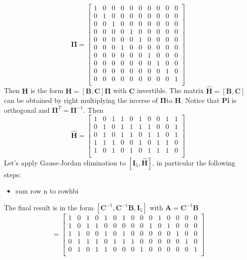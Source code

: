 \documentclass[10pt]{article}
\begin{document}
\begin{equation}
	\mathbf{\Pi} = 
	\begin{bmatrix}
		1&0&0&0&0&0&0&0&0&0\\
		0&1&0&0&0&0&0&0&0&0\\
		0&0&1&0&0&0&0&0&0&0\\
		0&0&0&0&1&0&0&0&0&0\\
		0&0&0&0&0&1&0&0&0&0\\
		0&0&0&1&0&0&0&0&0&0\\
		0&0&0&0&0&0&1&0&0&0\\
		0&0&0&0&0&0&0&1&0&0\\
		0&0&0&0&0&0&0&0&1&0\\
		0&0&0&0&0&0&0&0&0&1\\
	\end{bmatrix}
\end{equation}
Then $\mathbf{H}$ is the form $\mathbf{H} = [\mathbf{B}, \mathbf{C}]\mathbf{\Pi}$ with $\mathbf{C}$ invertible. The matrix $\mathbf{\hat{H}} = [\mathbf{B}, \mathbf{C}]$ can be obtained by right multiplying the inverse of $\mathbf{\Pi}$to $\mathbf{H}$. Notice that $\mathbf{Pi}$ is orthogonal and $\mathbf{\Pi}^T = \mathbf{\Pi}^{-1}$. Then 
\begin{equation}
\mathbf{\hat{H}} =
	\begin{bmatrix}
		1&0&1&1&0&1&0&0&1&1\\
		0&1&0&1&1&1&1&0&0&1\\
		0&1&0&1&1&0&1&1&0&1\\
		1&1&1&0&0&1&0&1&1&0\\
		1&0&1&0&1&0&1&1&1&0\\
	\end{bmatrix}
\end{equation}
Let's apply Gauss-Jordan elimination to $[\mathbf{I}_5, \mathbf{\hat{H}}]$, in particular the following steps:
\begin{itemize}
 \item sum row n to rowhbi
\end{itemize}
The final result is in the form $[\mathbf{C}^{-1}, \mathbf{C}^{-1}\mathbf{B}, \mathbf{I}_{5}]$ with $\mathbf{A} = \mathbf{C}^{-1}\mathbf{B}$
\begin{equation}
	[\mathbf{C}^{-1}, \mathbf{C}^{-1}\mathbf{B}, \mathbf{I}_{5}] = 
	\begin{bmatrix}
		1&0&1&0&1&0&1&0&0&0&1&0&0&0&0\\
		1&0&1&1&0&0&0&0&0&1&0&1&0&0&0\\
		1&1&0&0&1&0&1&0&0&0&0&0&1&0&0\\
		0&1&1&1&0&1&1&1&0&0&0&0&0&1&0\\
		0&1&0&1&1&0&0&0&1&0&0&0&0&0&1\\
	\end{bmatrix}
\end{equation}



\begin{thebibliography}{10}

\end{thebibliography}
\end{document}
